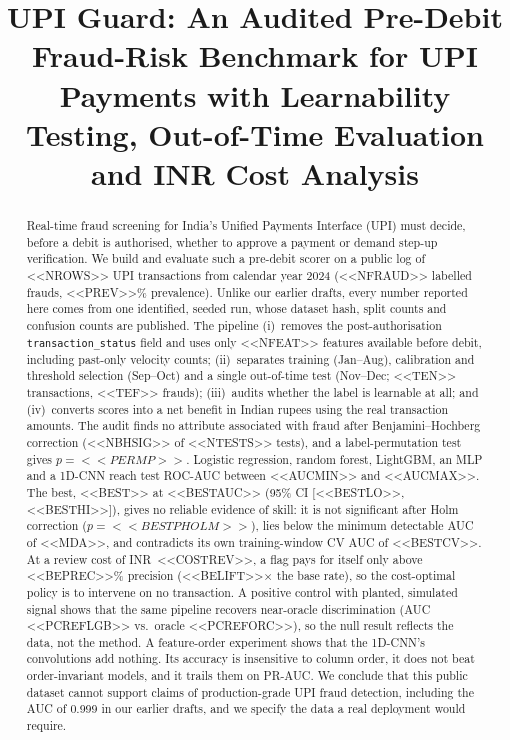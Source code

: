 \documentclass[conference]{IEEEtran}
\newcommand{\inr}{INR~}
\begin{document}
\title{UPI Guard: An Audited Pre-Debit Fraud-Risk Benchmark for UPI Payments with Learnability Testing, Out-of-Time Evaluation and INR Cost Analysis}

\author{
}

\maketitle

\begin{abstract}
Real-time fraud screening for India's Unified Payments Interface (UPI) must decide, before a debit is authorised, whether to approve a payment or demand step-up verification. We build and evaluate such a pre-debit scorer on a public log of <<NROWS>> UPI transactions from calendar year 2024 (<<NFRAUD>> labelled frauds, <<PREV>>\% prevalence). Unlike our earlier drafts, every number reported here comes from one identified, seeded run, whose dataset hash, split counts and confusion counts are published. The pipeline (i)~removes the post-authorisation \texttt{transaction\_status} field and uses only <<NFEAT>> features available before debit, including past-only velocity counts; (ii)~separates training (Jan--Aug), calibration and threshold selection (Sep--Oct) and a single out-of-time test (Nov--Dec; <<TEN>> transactions, <<TEF>> frauds); (iii)~audits whether the label is learnable at all; and (iv)~converts scores into a net benefit in Indian rupees using the real transaction amounts. The audit finds no attribute associated with fraud after Benjamini--Hochberg correction (<<NBHSIG>> of <<NTESTS>> tests), and a label-permutation test gives $p=<<PERMP>>$. Logistic regression, random forest, LightGBM, an MLP and a 1D-CNN reach test ROC-AUC between <<AUCMIN>> and <<AUCMAX>>. The best, <<BEST>> at <<BESTAUC>> (95\% CI [<<BESTLO>>, <<BESTHI>>]), gives no reliable evidence of skill: it is not significant after Holm correction ($p=<<BESTPHOLM>>$), lies below the minimum detectable AUC of <<MDA>>, and contradicts its own training-window CV AUC of <<BESTCV>>. At a review cost of \inr<<COSTREV>>, a flag pays for itself only above <<BEPREC>>\% precision (<<BELIFT>>$\times$ the base rate), so the cost-optimal policy is to intervene on no transaction. A positive control with planted, simulated signal shows that the same pipeline recovers near-oracle discrimination (AUC <<PCREFLGB>> vs.\ oracle <<PCREFORC>>), so the null result reflects the data, not the method. A feature-order experiment shows that the 1D-CNN's convolutions add nothing. Its accuracy is insensitive to column order, it does not beat order-invariant models, and it trails them on PR-AUC. We conclude that this public dataset cannot support claims of production-grade UPI fraud detection, including the AUC of 0.999 in our earlier drafts, and we specify the data a real deployment would require.
\end{abstract}
\end{document}
